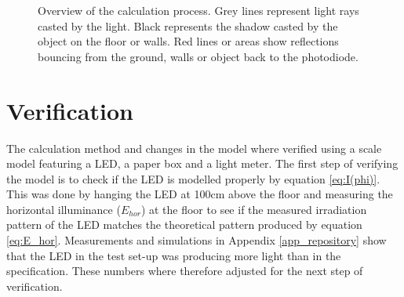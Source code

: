 \begin{figure}
	\centering     %
	\caption{Overview of the calculation process. Grey lines represent light rays casted by the light. Black represents the shadow casted by the object on the floor or walls. Red lines or areas show reflections bouncing from the ground, walls or object back to the photodiode.\label{fig:raytracing}}
\end{figure}

\section{Verification}
\label{sec:verification}
The calculation method and changes in the model where verified using a scale model featuring a LED\cite{lamptest}, a paper box and a light meter\cite{LuxMeter}. The first step of verifying the model is to check if the LED is modelled properly by equation \ref{eq:I(phi)}. This was done by hanging the LED at 100cm above the floor and measuring the horizontal illuminance ($E_{hor}$) at the floor to see if the measured irradiation pattern of the LED matches the theoretical pattern produced by equation \ref{eq:E_hor}. Measurements and simulations in Appendix \ref{app_repository} show that the LED in the test set-up was producing more light than in the specification. These numbers where therefore adjusted for the next step of verification.

